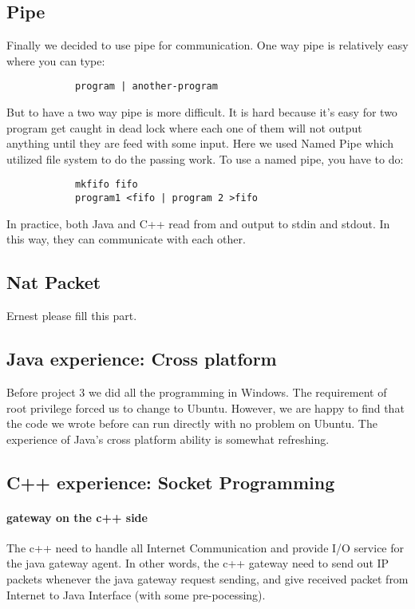 \documentclass[conference,compsoc]{IEEEtran}
\begin{document}
	\subsection{Pipe}
		Finally we decided to use pipe for communication.
		One way pipe is relatively easy where you can type:
		\begin{center}\begin{lstlisting}
			program | another-program
		\end{lstlisting}\end{center}
		But to have a two way pipe is more difficult.
		It is hard because it's easy for two program get caught in dead lock where each one of them will not output anything until they are feed with some input. 
		Here we used Named Pipe which utilized file system to do the passing work.
		To use a named pipe, you have to do:
		\begin{lstlisting} 
			mkfifo fifo
			program1 <fifo | program 2 >fifo
		\end{lstlisting}
		\par
		In practice, both Java and C++ read from and output to stdin and stdout. 
		In this way, they can communicate with each other.

	\subsection{Nat Packet}
		Ernest please fill this part.
	
	\subsection{Java experience: Cross platform}
		Before project 3 we did all the programming in Windows.
		The requirement of root privilege forced us to change to Ubuntu.
		However, we are happy to find that the code we wrote before can run directly with no problem on Ubuntu.
		The experience of Java's cross platform ability is somewhat refreshing.

	\subsection{C++ experience: Socket Programming}
		\paragraph{\textbf{gateway on the c++ side}}
		The c++ need to handle all Internet Communication and provide I/O service for the java gateway agent. In other words, the c++ gateway need to send out IP packets whenever the java gateway request sending, and give received packet from Internet to Java Interface (with some pre-pocessing).
		
\end{document}
